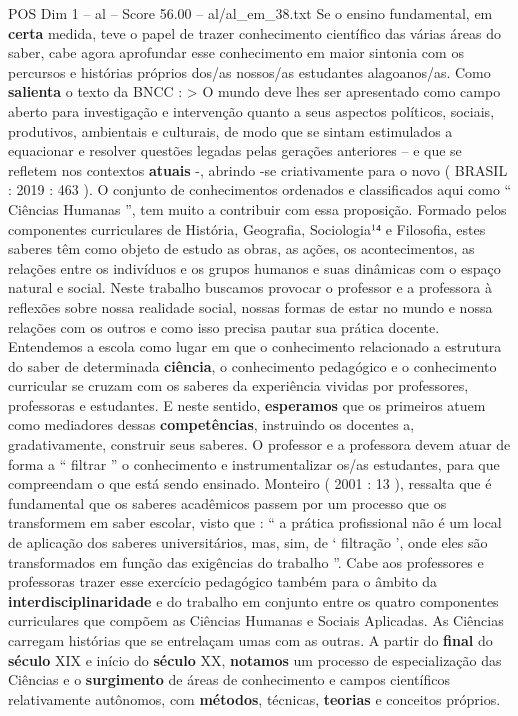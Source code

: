 \begin{textsample}{POS Dim 1 – al – Score 56.00 – al/al\_em\_38.txt}
Se o ensino fundamental, em \textbf{certa} medida, teve o papel de trazer conhecimento científico das várias áreas do saber, cabe agora aprofundar esse conhecimento em maior sintonia com os percursos e histórias próprios dos/as nossos/as estudantes alagoanos/as.
Como \textbf{salienta} o texto da BNCC : > O mundo deve lhes ser apresentado como campo aberto para investigação e intervenção quanto a seus aspectos políticos, sociais, produtivos, ambientais e culturais, de modo que se sintam estimulados a equacionar e resolver questões legadas pelas gerações anteriores – e que se refletem nos contextos \textbf{atuais} -, abrindo -se criativamente para o novo ( BRASIL : 2019 : 463 ).
O conjunto de conhecimentos ordenados e classificados aqui como “ Ciências Humanas ”, tem muito a contribuir com essa proposição.
Formado pelos componentes curriculares de História, Geografia, Sociologia¹⁴ e Filosofia, estes saberes têm como objeto de estudo as obras, as ações, os acontecimentos, as relações entre os indivíduos e os grupos humanos e suas dinâmicas com o espaço natural e social.
Neste trabalho buscamos provocar o professor e a professora à reflexões sobre nossa realidade social, nossas formas de estar no mundo e nossa relações com os outros e como isso precisa pautar sua prática docente.
Entendemos a escola como lugar em que o conhecimento relacionado a estrutura do saber de determinada \textbf{ciência}, o conhecimento pedagógico e o conhecimento curricular se cruzam com os saberes da experiência vividas por professores, professoras e estudantes.
E neste sentido, \textbf{esperamos} que os primeiros atuem como mediadores dessas \textbf{competências}, instruindo os docentes a, gradativamente, construir seus saberes.
O professor e a professora devem atuar de forma a “ filtrar ” o conhecimento e instrumentalizar os/as estudantes, para que compreendam o que está sendo ensinado.
Monteiro ( 2001 : 13 ), ressalta que é fundamental que os saberes acadêmicos passem por um processo que os transformem em saber escolar, visto que : “ a prática profissional não é um local de aplicação dos saberes universitários, mas, sim, de ‘ filtração ’, onde eles são transformados em função das exigências do trabalho ”.
Cabe aos professores e professoras trazer esse exercício pedagógico também para o âmbito da \textbf{interdisciplinaridade} e do trabalho em conjunto entre os quatro componentes curriculares que compõem as Ciências Humanas e Sociais Aplicadas.
As Ciências carregam histórias que se entrelaçam umas com as outras.
A partir do \textbf{final} do \textbf{século} XIX e início do \textbf{século} XX, \textbf{notamos} um processo de especialização das Ciências e o \textbf{surgimento} de áreas de conhecimento e campos científicos relativamente autônomos, com \textbf{métodos}, técnicas, \textbf{teorias} e conceitos próprios.

\end{textsample}
